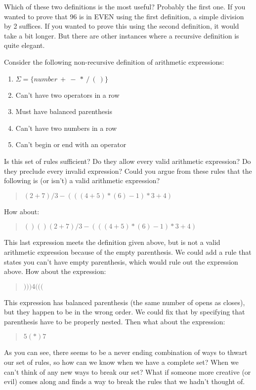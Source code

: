 \documentclass[letterpaper,12pt,openany,reqno]{book}%
\begin{document}
Which of these two definitions is the most useful? Probably the first one. If you wanted to prove that 96 is in EVEN using the first definition, a simple division by 2 suffices. If you wanted to prove this using the second definition, it would take a bit longer. But there are other instances where a recursive definition is quite elegant.

Consider the following non-recursive definition of arithmetic expressions:
\begin{enumerate}
\item $\Sigma = \{ number\ +\ -\ *\ /\ (\ ) \}$
\item Can't have two operators in a row
\item Must have balanced parenthesis
\item Can't have two numbers in a row
\item Can't begin or end with an operator
\end{enumerate}

Is this set of rules sufficient? Do they allow every valid arithmetic expression? Do they preclude every invalid expression? Could you argue from these rules that the following is (or isn't) a valid arithmetic expression?
\begin{quote}
$(2+7)/3-(((4+5)*(6)-1)*3 + 4)$
\end{quote}
How about:
\begin{quote}
$()()(2+7)/3-(((4+5)*(6)-1)*3 + 4)$
\end{quote}
This last expression meets the definition given above, but is not a valid arithmetic expression because of the empty parenthesis. We could add a rule that states you can't have empty parenthesis, which would rule out the expression above. How about the expression:
\begin{quote}
$)))4((($
\end{quote}
This expression has balanced parenthesis (the same number of opens as closes), but they happen to be in the wrong order. We could fix that by specifying that parenthesis have to be properly nested. Then what about the expression:
\begin{quote}
$5(*)7$
\end{quote}
As you can see, there seems to be a never ending combination of ways to thwart our set of rules, so how can we know when we have a complete set? When we can't think of any new ways to break our set? What if someone more creative (or evil) comes along and finds a way to break the rules that we hadn't thought of.
\end{document}
